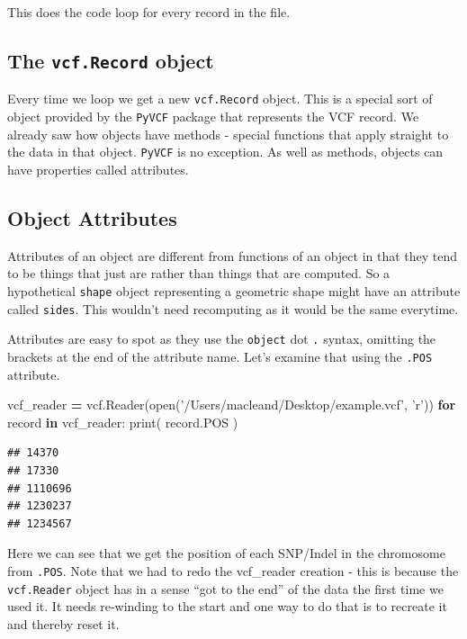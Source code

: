 \documentclass[]{book}
\newenvironment{Shaded}{\begin{snugshade}}{\end{snugshade}}
\newcommand{\BuiltInTok}[1]{#1}
\newcommand{\ControlFlowTok}[1]{\textcolor[rgb]{0.13,0.29,0.53}{\textbf{#1}}}
\newcommand{\KeywordTok}[1]{\textcolor[rgb]{0.13,0.29,0.53}{\textbf{#1}}}
\newcommand{\NormalTok}[1]{#1}
\newcommand{\OperatorTok}[1]{\textcolor[rgb]{0.81,0.36,0.00}{\textbf{#1}}}
\newcommand{\StringTok}[1]{\textcolor[rgb]{0.31,0.60,0.02}{#1}}
\theoremstyle{definition}
\theoremstyle{definition}
\theoremstyle{definition}
\theoremstyle{remark}
\begin{document}
This does the code loop for every record in the file.

\hypertarget{the-vcf.record-object}{%
\subsection{\texorpdfstring{The \texttt{vcf.Record}
object}{The vcf.Record object}}\label{the-vcf.record-object}}

Every time we loop we get a new \texttt{vcf.Record} object. This is a
special sort of object provided by the \texttt{PyVCF} package that
represents the VCF record. We already saw how objects have methods -
special functions that apply straight to the data in that object.
\texttt{PyVCF} is no exception. As well as methods, objects can have
properties called attributes.

\hypertarget{object-attributes}{%
\subsection{Object Attributes}\label{object-attributes}}

Attributes of an object are different from functions of an object in
that they tend to be things that just are rather than things that are
computed. So a hypothetical \texttt{shape} object representing a
geometric shape might have an attribute called \texttt{sides}. This
wouldn't need recomputing as it would be the same everytime.

Attributes are easy to spot as they use the \texttt{object} dot
\texttt{.} syntax, omitting the brackets at the end of the attribute
name. Let's examine that using the \texttt{.POS} attribute.

\begin{Shaded}
\begin{Highlighting}[]
\NormalTok{vcf_reader }\OperatorTok{=}\NormalTok{ vcf.Reader(}\BuiltInTok{open}\NormalTok{(}\StringTok{'/Users/macleand/Desktop/example.vcf'}\NormalTok{, }\StringTok{'r'}\NormalTok{))}
\ControlFlowTok{for}\NormalTok{ record }\KeywordTok{in}\NormalTok{ vcf_reader:}
  \BuiltInTok{print}\NormalTok{( record.POS )}
\end{Highlighting}
\end{Shaded}

\begin{verbatim}
## 14370
## 17330
## 1110696
## 1230237
## 1234567
\end{verbatim}

Here we can see that we get the position of each SNP/Indel in the
chromosome from \texttt{.POS}. Note that we had to redo the vcf\_reader
creation - this is because the \texttt{vcf.Reader} object has in a sense
``got to the end'' of the data the first time we used it. It needs
re-winding to the start and one way to do that is to recreate it and
thereby reset it.
\end{document}
